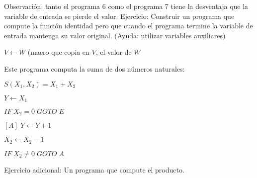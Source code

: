 Observaci\'on: tanto el programa 6 como el programa 7 tiene la desventaja que la variable de entrada se pierde el valor. Ejercicio: Construir un programa que compute la funci\'on identidad pero que cuando el programa termine la variable de entrada mantenga su valor original. (Ayuda: utilizar variables auxiliares)
 
\begin{example}
$V \leftarrow W$ (macro que copia en $V$, el valor de $W$
\end{example}
 
\begin{example}
Este programa computa la suma de dos n\'umeros naturales:
 
$S(X_1, X_2) = X_1 + X_2$
 
$Y \leftarrow X_1$
 
$IF \; X_2 = 0 \; GOTO \; E$
 
$[A] \; Y \leftarrow Y + 1$
 
$X_2 \leftarrow X_2 - 1$
 
$IF \; X_2 \neq 0 \; GOTO \; A$
 
\end{example}
 
Ejercicio adicional: Un programa que compute el producto.
 
 
